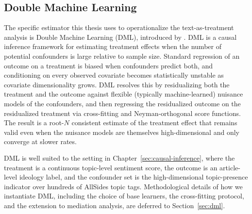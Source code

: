 \subsection{Double Machine Learning}
\label{sec:dml-related-work}

The specific estimator this thesis uses to operationalize the text-as-treatment analysis is Double Machine Learning (DML), introduced by \citet{chernozhukov2018}. DML is a causal inference framework for estimating treatment effects when the number of potential confounders is large relative to sample size. Standard regression of an outcome on a treatment is biased when confounders predict both, and conditioning on every observed covariate becomes statistically unstable as covariate dimensionality grows. DML resolves this by residualizing both the treatment and the outcome against flexible (typically machine-learned) nuisance models of the confounders, and then regressing the residualized outcome on the residualized treatment via cross-fitting and Neyman-orthogonal score functions. The result is a root-$N$ consistent estimate of the treatment effect that remains valid even when the nuisance models are themselves high-dimensional and only converge at slower rates.

DML is well suited to the setting in Chapter~\ref{sec:causal-inference}, where the treatment is a continuous topic-level sentiment score, the outcome is an article-level ideology label, and the confounder set is the high-dimensional topic-presence indicator over hundreds of AllSides topic tags. Methodological details of how we instantiate DML, including the choice of base learners, the cross-fitting protocol, and the extension to mediation analysis, are deferred to Section~\ref{sec:dml}.
